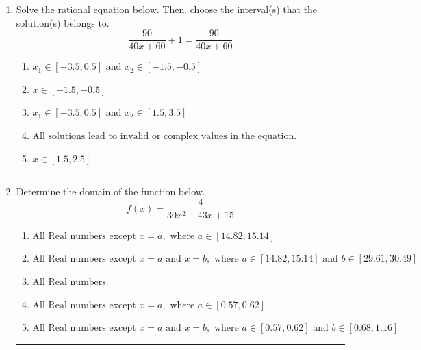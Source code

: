 \documentclass[14pt]{extbook}
\newcommand{\litem}[1]{\item#1\hspace*{-1cm}\rule{\textwidth}{0.4pt}}
\begin{document}
\begin{enumerate}
{\begin{enumerate}[label=\Alph*.]
\end{enumerate} }
\litem{
Solve the rational equation below. Then, choose the interval(s) that the solution(s) belongs to.\[ \frac{90}{40x + 60} + 1 = \frac{90}{40x + 60} \]\begin{enumerate}[label=\Alph*.]
\item \( x_1 \in [-3.5, 0.5] \text{ and } x_2 \in [-1.5,-0.5] \)
\item \( x \in [-1.5,-0.5] \)
\item \( x_1 \in [-3.5, 0.5] \text{ and } x_2 \in [1.5,3.5] \)
\item \( \text{All solutions lead to invalid or complex values in the equation.} \)
\item \( x \in [1.5,2.5] \)

\end{enumerate} }
\litem{
Determine the domain of the function below.\[ f(x) = \frac{4}{30x^{2} -43 x + 15} \]\begin{enumerate}[label=\Alph*.]
\item \( \text{All Real numbers except } x = a, \text{ where } a \in [14.82, 15.14] \)
\item \( \text{All Real numbers except } x = a \text{ and } x = b, \text{ where } a \in [14.82, 15.14] \text{ and } b \in [29.61, 30.49] \)
\item \( \text{All Real numbers.} \)
\item \( \text{All Real numbers except } x = a, \text{ where } a \in [0.57, 0.62] \)
\item \( \text{All Real numbers except } x = a \text{ and } x = b, \text{ where } a \in [0.57, 0.62] \text{ and } b \in [0.68, 1.16] \)


\end{enumerate}}
\end{enumerate}
\end{document}
